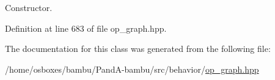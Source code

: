 Constructor. 



Definition at line 683 of file op\+\_\+graph.\+hpp.



The documentation for this class was generated from the following file\+:\begin{DoxyCompactItemize}
\item 
/home/osboxes/bambu/\+Pand\+A-\/bambu/src/behavior/\hyperlink{op__graph_8hpp}{op\+\_\+graph.\+hpp}\end{DoxyCompactItemize}
